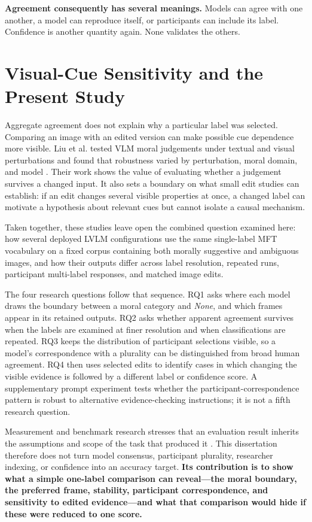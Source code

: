 \textbf{Agreement consequently has several meanings.} Models can agree with
one another, a model can reproduce itself, or participants can include its
label. Confidence is another quantity again. None validates the others.


\section{Visual-Cue Sensitivity and the Present Study}
\label{sec:research_positioning}

Aggregate agreement does not explain why a particular label was selected.
Comparing an image with an edited version can make possible cue dependence more
visible. Liu et al. tested VLM moral judgements under textual and visual
perturbations and found that robustness varied by perturbation, moral domain,
and model \cite{liu2026moralbackbone}. Their work shows the value of evaluating
whether a judgement survives a changed input. It also sets a boundary on what
small edit studies can establish: if an edit changes several visible
properties at once, a changed label can motivate a hypothesis about relevant
cues but cannot isolate a causal mechanism.

Taken together, these studies leave open the combined question examined here:
how several deployed LVLM configurations use the same single-label MFT
vocabulary on a fixed corpus containing both morally suggestive and ambiguous
images, and how their outputs differ across label resolution, repeated runs,
participant multi-label responses, and matched image edits.

The four research questions follow that sequence. RQ1 asks where each model
draws the boundary between a moral category and \textit{None}, and which frames
appear in its retained outputs. RQ2 asks whether apparent agreement survives
when the labels are examined at finer resolution and when classifications are
repeated. RQ3 keeps the distribution of participant selections visible, so a
model's correspondence with a plurality can be distinguished from broad human
agreement. RQ4 then uses selected edits to identify cases in which changing the
visible evidence is followed by a different label or confidence score. A
supplementary prompt experiment tests whether the participant-correspondence
pattern is robust to alternative evidence-checking instructions; it is not a
fifth research question.

Measurement and benchmark research stresses that an evaluation result inherits
the assumptions and scope of the task that produced it
\cite{jacobs2021measurement,raji2021benchmark}. This dissertation therefore
does not turn model consensus, participant plurality, researcher indexing, or
confidence into an accuracy target. \textbf{Its contribution is to show what a
simple one-label comparison can reveal---the moral boundary, the preferred
frame, stability, participant correspondence, and sensitivity to edited
evidence---and what that comparison would hide if these were reduced to one
score.}
